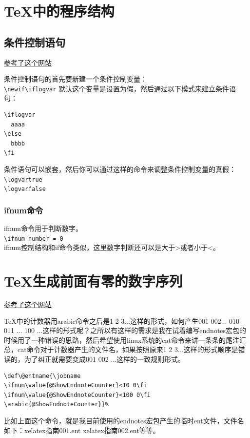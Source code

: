 \documentclass[11pt,oneside]{book}
\begin{document}
\section{TeX中的程序结构}
\subsection{条件控制语句}
\label{sec:条件控制语句}
\href{http://handyfloss.wordpress.com/2007/08/29/latex-programming-how-to-implement-conditionals/}{参考了这个网站}

条件控制语句的首先要新建一个条件控制变量：\\
\verb+\newif\iflogvar+
默认这个变量是设置为假，然后通过以下模式来建立条件语句：
\begin{Verbatim}
\iflogvar
  aaaa
\else
  bbbb
\fi
\end{Verbatim}
条件语句可以嵌套，然后你可以通过这样的命令来调整条件控制变量的真假：\\
\verb+\logvartrue+\\
\verb+\logvarfalse+

\subsubsection{ifnum命令}
ifnum命令用于判断数字。\\
\verb+\ifnum number = 0+\\
ifnum控制结构和if命令类似，这里数字判断还可以是大于>或者小于<。

\section{TeX生成前面有零的数字序列}
\href{http://tex.stackexchange.com/questions/30930/how-to-output-a-counter-with-leading-zeros}{参考了这个网站}

TeX中的计数器用arabic命令之后是1 2 3...这样的形式，如何产生001 002... 010 011 ... 100 ...这样的形式呢？之所以有这样的需求是我在试着编写endnotes宏包的时候用了一种错误的思路，然后希望使用linux系统的cat命令来讲一条条的尾注汇总，cat命令对于计数器产生的文件名，如果按照原来1 2 3...这样的形式顺序是错误的，为了纠正就需要变成001  002 ...这样的一致规则形式。

\begin{Verbatim}
\def\@entname{\jobname
\ifnum\value{@ShowEndnoteCounter}<10 0\fi
\ifnum\value{@ShowEndnoteCounter}<100 0\fi
\arabic{@ShowEndnoteCounter}}%
\end{Verbatim}

比如上面这个命令，就是我目前使用的endnotes宏包产生的临时ent文件，文件名如下：xelatex指南001.ent xelatex指南002.ent等等。
\end{document}

